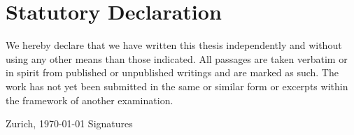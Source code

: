 \chapter*{Statutory Declaration}

\vspace{3cm}

We hereby declare that we have written this thesis independently and without using any other means than those indicated. All passages are taken verbatim or in spirit from published or unpublished writings and are marked as such. The work has not yet been submitted in the same or similar form or excerpts within the framework of another examination.

\vspace{5cm}

Zurich, \today \hspace{5cm} Signatures